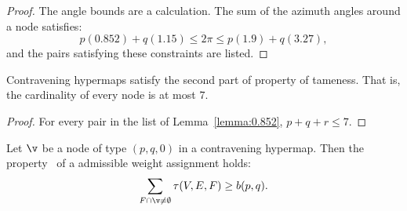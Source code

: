 \begin{proof}
The angle bounds are a calculation.  The sum of the azimuth angles
around a node satisfies:
\begin{displaymath}
p (0.852) + q (1.15) \le 2\pi \le p (1.9) + q (3.27),
\end{displaymath}
and the pairs satisfying these constraints are listed.
\end{proof}

\begin{lemma}[]\label{lemma:node-upper}
Contravening hypermaps satisfy the second part of property 
of tameness.  That is, the cardinality of every
node is at most $7$.
\end{lemma}

\begin{proof}  For every pair in the list of Lemma~\ref{lemma:0.852},  $p+q+r\le 7$.
\end{proof}




\begin{lemma}[] \label{lemma:weightB}
  Let $\v$ be a node of type $(p,q,0)$ in a contravening hypermap.
  Then the property~ of a admissible weight assignment
  holds:
\begin{displaymath}
\sum_{ F\cap \v\ne \emptyset} \tau(V,E,F) \ge  b(p,q).
\end{displaymath}
\end{lemma}
%
%

